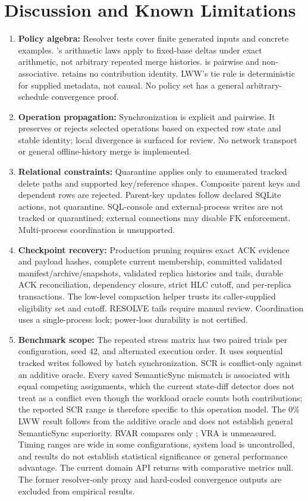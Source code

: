 \documentclass[runningheads]{llncs}
\begin{document}
\section{Discussion and Known Limitations}
\begin{enumerate}
\item \textbf{Policy algebra:} Resolver tests cover finite generated inputs and concrete examples. \texttt{}'s arithmetic laws apply to fixed-base deltas under exact arithmetic, not arbitrary repeated merge histories. \texttt{} is pairwise and non-associative. \texttt{} retains no contribution identity. LWW's tie rule is deterministic for supplied metadata, not causal. No policy set has a general arbitrary-schedule convergence proof.
\item \textbf{Operation propagation:} Synchronization is explicit and pairwise. It preserves or rejects selected operations based on expected row state and stable identity; local divergence is surfaced for review. No network transport or general offline-history merge is implemented.
\item \textbf{Relational constraints:} Quarantine applies only to enumerated tracked delete paths and supported key/reference shapes. Composite parent keys and \texttt{} dependent rows are rejected. Parent-key updates follow declared SQLite actions, not quarantine. SQL-console and external-process writes are not tracked or quarantined; external connections may disable FK enforcement. Multi-process coordination is unsupported.
\item \textbf{Checkpoint recovery:} Production pruning requires exact ACK evidence and payload hashes, complete current membership, committed validated manifest/archive/snapshots, validated replica histories and tails, durable ACK reconciliation, dependency closure, strict HLC cutoff, and per-replica transactions. The low-level compaction helper trusts its caller-supplied eligibility set and cutoff. RESOLVE tails require manual review. Coordination uses a single-process lock; power-loss durability is not certified.
\item \textbf{Benchmark scope:} The repeated stress matrix has two paired trials per configuration, seed 42, and alternated execution order. It uses sequential tracked writes followed by batch synchronization. SCR is conflict-only against an additive oracle. Every saved SemanticSync mismatch is associated with equal competing assignments, which the current state-diff detector does not treat as a conflict even though the workload oracle counts both contributions; the reported SCR range is therefore specific to this operation model. The 0\% LWW result follows from the additive oracle and does not establish general SemanticSync superiority. RVAR compares only \texttt{}; VRA is unmeasured. Timing ranges are wide in some configurations, system load is uncontrolled, and results do not establish statistical significance or general performance advantage. The current domain API returns \texttt{} with comparative metrics null. The former resolver-only proxy and hard-coded convergence outputs are excluded from empirical results.

\end{enumerate}
\end{document}
